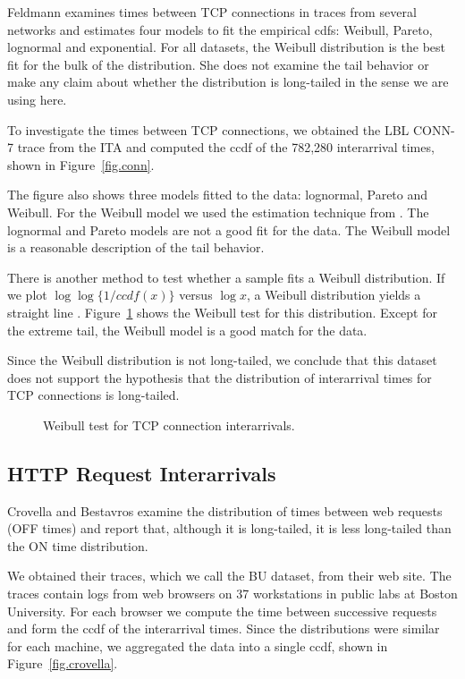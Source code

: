 \documentclass[twocolumn,11pt]{infocom}
\begin{document}
Feldmann \cite{Feldmann98} examines times between TCP connections in
traces from several networks and estimates four models to fit the
empirical cdfs: Weibull, Pareto, lognormal and exponential.  For all
datasets, the Weibull distribution is the best fit for the bulk of the
distribution.  She does not examine the tail behavior or
make any claim about whether the distribution is long-tailed in the
sense we are using here.

To investigate the times between TCP connections, we obtained
the LBL CONN-7 trace from the ITA and computed the ccdf of the
782,280 interarrival times, shown in Figure~\ref{fig.conn}.

The figure also shows three models fitted to the data: lognormal, Pareto
and Weibull.  For the Weibull model we used the
estimation technique from \cite{Feldmann98}.  The lognormal and Pareto
models are not a good fit for the data.  The Weibull model is a
reasonable description of the tail behavior.

There is another method to test whether a sample fits a Weibull
distribution.  If we plot $\log \log \{1 / ccdf(x)\}$ versus
$\log x$, a Weibull distribution yields a straight line
\cite{JohnsonKotzBalakrishnan94}.
Figure~\ref{fig.weibull} shows the Weibull test for this distribution. 
Except for the extreme tail, the Weibull model is a good match
for the data.

Since the Weibull distribution is not long-tailed, we conclude that
this dataset does not support the hypothesis that the distribution of
interarrival times for TCP connections is long-tailed.

\begin{figure}
\centerline{}
\caption{Weibull test for TCP connection interarrivals.}
\label{fig.weibull}
\end{figure}


\subsection{HTTP Request Interarrivals}

Crovella and Bestavros \cite{CrovellaBestavros95} examine the
distribution of times between web requests (OFF times) and report
that, although it is long-tailed, it is less long-tailed than the ON
time distribution.

We obtained their traces, which we call the BU dataset, from their web
site.  The traces contain logs from web browsers on 37 workstations in
public labs at Boston University.  For each browser we compute the
time between successive requests and form the ccdf of the interarrival
times.  Since the distributions were similar for each machine, we
aggregated the data into a single ccdf, shown in
Figure~\ref{fig.crovella}.
\end{document}

